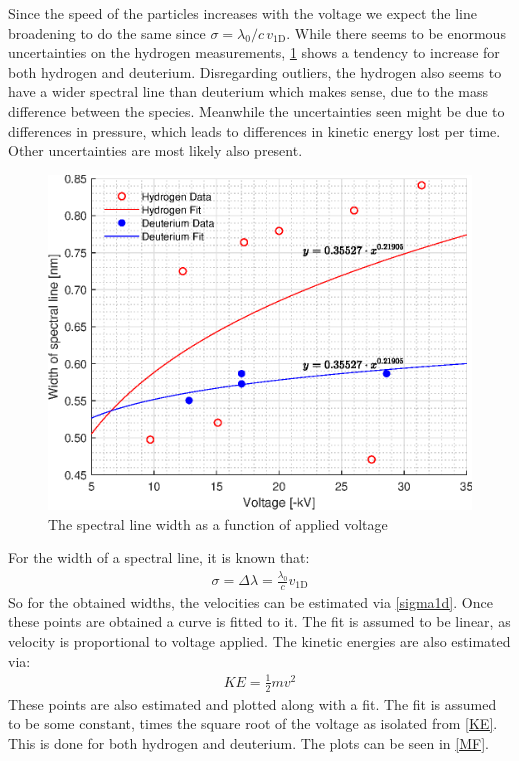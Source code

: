 Since the speed of the particles increases with the voltage we expect the line broadening to do the same since \(\sigma=\lambda_{0}/c\, v_{\mathrm{1D}}\). While there seems to be enormous uncertainties on the hydrogen measurements, \cref{Vsigma} shows a tendency to increase for both hydrogen and deuterium. Disregarding outliers, the hydrogen also seems to have a wider spectral line than deuterium which makes sense, due to the mass difference between the species. Meanwhile the uncertainties seen might be due to differences in pressure, which leads to differences in kinetic energy lost per time. Other uncertainties are most likely also present.
\begin{figure}[p]
	\centering
	\includegraphics[width=.8\textwidth]{MatlabFigures/Asign3/VSigma.eps}
	\caption{The spectral line width as a function of applied voltage}
	\label{Vsigma}
\end{figure}
For the width of a spectral line, it is known that:
\begin{align}
	\sigma = \Delta\lambda = \frac{\lambda_0}{c} v_{\mathrm{1D}}\label{sigma1d}
\end{align}
So for the obtained widths, the velocities can be estimated via \cref{sigma1d}. Once these points are obtained a curve is fitted to it. The fit is assumed to be linear, as velocity is proportional to voltage applied. The kinetic energies are also estimated via:
\begin{align}
	KE = \frac{1}{2}mv^2\label{KE}
\end{align}
These points are also estimated and plotted along with a fit. The fit is assumed to be some constant, times the square root of the voltage as isolated from \cref{KE}. This is done for both hydrogen and deuterium. The plots can be seen in \cref{MF}.
